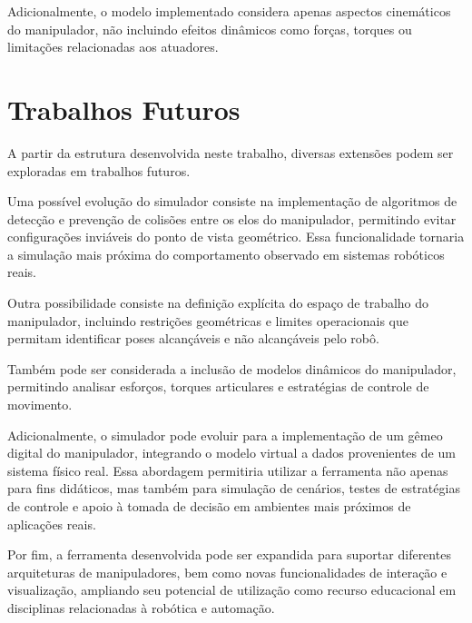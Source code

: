 Adicionalmente, o modelo implementado considera apenas aspectos cinemáticos do manipulador, não incluindo efeitos dinâmicos como forças, torques ou limitações relacionadas aos atuadores.

\section{Trabalhos Futuros}

A partir da estrutura desenvolvida neste trabalho, diversas extensões podem ser exploradas em trabalhos futuros.

Uma possível evolução do simulador consiste na implementação de algoritmos de detecção e prevenção de colisões entre os elos do manipulador, permitindo evitar configurações inviáveis do ponto de vista geométrico. Essa funcionalidade tornaria a simulação mais próxima do comportamento observado em sistemas robóticos reais.

Outra possibilidade consiste na definição explícita do espaço de trabalho do manipulador, incluindo restrições geométricas e limites operacionais que permitam identificar poses alcançáveis e não alcançáveis pelo robô.

Também pode ser considerada a inclusão de modelos dinâmicos do manipulador, permitindo analisar esforços, torques articulares e estratégias de controle de movimento.

Adicionalmente, o simulador pode evoluir para a implementação de um gêmeo digital do manipulador, integrando o modelo virtual a dados provenientes de um sistema físico real. Essa abordagem permitiria utilizar a ferramenta não apenas para fins didáticos, mas também para simulação de cenários, testes de estratégias de controle e apoio à tomada de decisão em ambientes mais próximos de aplicações reais.

Por fim, a ferramenta desenvolvida pode ser expandida para suportar diferentes arquiteturas de manipuladores, bem como novas funcionalidades de interação e visualização, ampliando seu potencial de utilização como recurso educacional em disciplinas relacionadas à robótica e automação.
